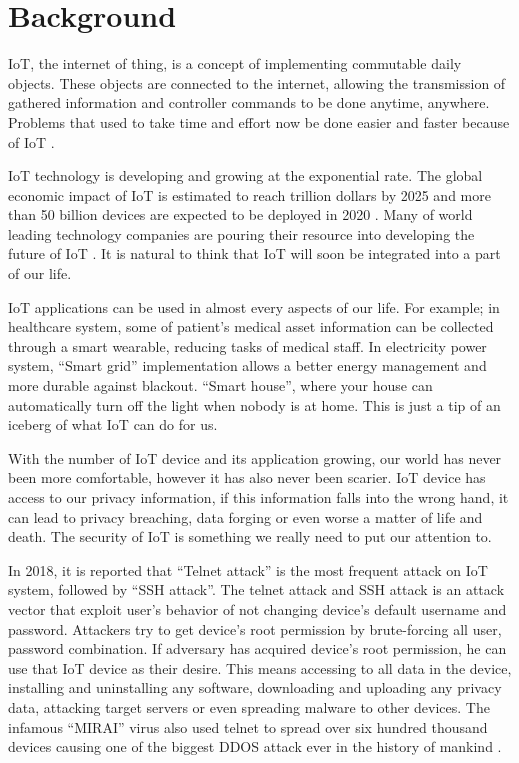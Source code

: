 \section{Background}

IoT, the internet of thing, is a concept of implementing commutable daily objects. These objects are connected to the internet, allowing the transmission of gathered information and controller commands to be done anytime, anywhere. 
Problems that used to take time and effort now be done easier and faster because of IoT \cite{INTRO:2}\cite{INTRO:3}. 

IoT technology is developing and growing at the exponential rate. The global economic impact of IoT is estimated to reach trillion dollars by 2025 and more than 50 billion devices are expected to be deployed in 2020 \parencite{INTRO:1}. Many of world leading technology companies are pouring their resource into developing the future of IoT \parencite{INTRO:7123563}. It is natural to think that IoT will soon be integrated into a part of our life.  
  
IoT applications can be used in almost every aspects of our life. For example; in healthcare system, some of patient’s medical asset information can be collected through a smart wearable, reducing tasks of medical staff. In electricity power system, “Smart grid” implementation allows a better energy management and more durable against blackout. “Smart house”, where your house can automatically turn off the light when nobody is at home. This is just a tip of an iceberg of what IoT can do for us. 
 
With the number of IoT device and its application growing, our world has never been more comfortable, however it has also never been scarier. IoT device has access to our privacy information, if this information falls into the wrong hand, it can lead to privacy breaching, data forging or even worse a matter of life and death\parencite{ATTACK:2}\parencite{ATTACK:3}. The security of IoT is something we really need to put our attention to. 
  
In 2018, it is reported that “Telnet attack” is the most frequent attack on IoT system, followed by “SSH attack”\cite{ATTACK:1}. The telnet attack and SSH attack is an attack vector that exploit user’s behavior of not changing device’s default username and password. Attackers try to get device’s root permission by brute-forcing all user, password combination. If adversary has acquired device’s root permission, he can use that IoT device as their desire. This means accessing to all data in the device, installing and uninstalling any software, downloading and uploading any privacy data, attacking target servers or even spreading malware to other devices. The infamous “MIRAI” virus also used telnet to spread over six hundred thousand devices causing one of the biggest DDOS attack ever in the history of mankind \parencite{ATTACK:7971869}.

